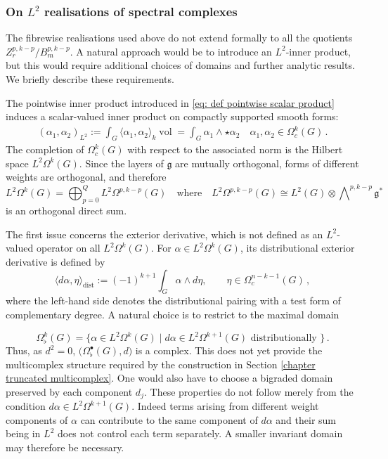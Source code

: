 \documentclass[dvipsnames]{amsart}
\theoremstyle{definition}
\theoremstyle{definition}
\numberwithin{equation}{section}
\begin{document}
\subsubsection{On $L^2$ realisations of spectral complexes}\label{subsect: Orthogonal realisations of the spectral complexes}
The fibrewise realisations used above do not extend formally to all the quotients $Z_r^{p,k-p}/B_m^{p,k-p}$. A natural approach would be to introduce an $L^2$-inner product, but this would require additional choices of domains and further analytic results. We briefly describe these requirements.

The pointwise inner product introduced in \eqref{eq: def pointwise scalar product} induces a scalar-valued inner product on compactly supported smooth forms:
\begin{align*}
    (\alpha_1,\alpha_2)_{L^2}:=\int_G\langle\alpha_1,\alpha_2\rangle_k\operatorname{vol}=\int_G\alpha_1\wedge\star\alpha_2 \quad \alpha_1,\alpha_2\in\Omega_c^k(G)\,.
\end{align*}
 The completion of $\Omega_c^k(G)$ with respect to the associated norm is the Hilbert space $L^2\Omega^k(G)$. Since the layers of $\mathfrak g$ are mutually
orthogonal, forms of different weights are orthogonal, and therefore
$$
L^2\Omega^k(G)
=
\bigoplus_{p=0}^Q L^2\Omega^{p,k-p}(G) \quad\text{where} \quad L^2\Omega^{p,k-p}(G)\cong L^2(G) \otimes \bigwedge\nolimits^{p,k-p} \mathfrak{g}^*
$$
is an orthogonal direct sum. 

The first issue concerns the exterior derivative, which is not defined as an $L^2$-valued operator on all $L^2\Omega^k(G)$. For $\alpha\in L^2\Omega^k(G)$, its distributional
exterior derivative is defined by
$$\langle d\alpha,\eta\rangle_{\mathrm{dist}}
    :=
    (-1)^{k+1}\int_G\alpha\wedge d\eta,
    \qquad
    \eta\in\Omega_c^{n-k-1}(G)\,,$$
where the left-hand side denotes the distributional pairing
with a test form of complementary degree. A natural choice is to restrict to the maximal domain

\begin{equation*}
    \Omega_{\flat}^k(G) = \big\{ \alpha \in L^2\Omega^k(G) \mid d\alpha \in L^2\Omega^{k+1}(G) \text{ distributionally }\big\}\,.
\end{equation*}
Thus, as $d^2 = 0$, $\big(\Omega_{\flat}^\bullet(G), d\big)$ is a complex. 
This does not yet provide the multicomplex structure required by the construction in Section \ref{chapter truncated multicomplex}. One would also have to choose a bigraded domain preserved by each component $d_j$. These properties do not follow merely from the condition $d\alpha \in L^2\Omega^{k+1}(G)$. Indeed terms arising from different weight components of $\alpha$ can contribute to the same component of $d\alpha$ and their sum being in $L^2$ does not control each term separately.
A smaller invariant domain may therefore be necessary. 
\end{document}

